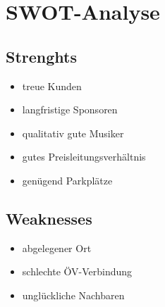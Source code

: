 \documentclass[a4paper, titlepage]{article}
\begin{document}
\section{SWOT-Analyse}
\subsection{Strenghts}
\begin{itemize}
  \item treue Kunden
  \item langfristige Sponsoren
  \item qualitativ gute Musiker
  \item gutes Preisleitungsverhältnis
  \item genügend Parkplätze
\end{itemize}
\subsection{Weaknesses}
\begin{itemize}
  \item abgelegener Ort
  \item schlechte ÖV-Verbindung
  \item unglückliche Nachbaren
\end{itemize}
\end{document}
